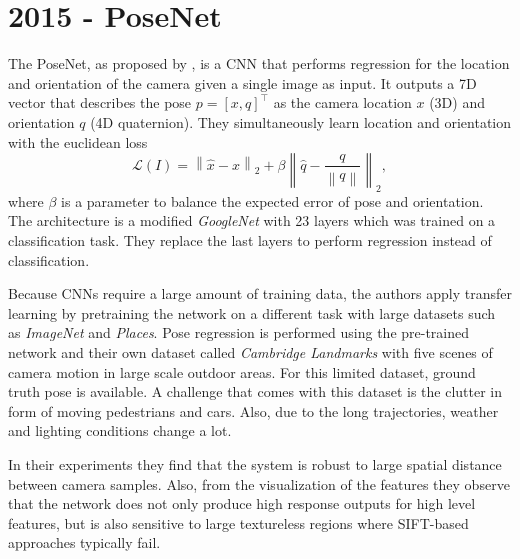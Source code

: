 %		
%		
	
	\section{2015 - PoseNet}
		The PoseNet, as proposed by \cite{kendall2015posenet}, is a CNN that performs regression for the location and orientation of the camera given a single image as input.
		It outputs a 7D vector that describes the pose $p = [x, q]^\top$ as the camera location $x$ (3D) and orientation $q$ (4D quaternion).
		They simultaneously learn location and orientation with the euclidean loss
		\begin{equation}
			\mathcal{L}(I) = 
			\left\|
				\hat{x} - x 
			\right\|_2 
			+ \beta 
			\left\| 
				\hat{q} - \frac{q}{\left\| q \right\|} 
			\right\|_2,
		\end{equation}
		where $\beta$ is a parameter to balance the expected error of pose and orientation.
		The architecture is a modified \emph{GoogleNet} with 23 layers which was trained on a classification task.
		They replace the last layers to perform regression instead of classification.
		
		Because CNNs require a large amount of training data, the authors apply transfer learning by pretraining the network on a different task with large datasets such as \emph{ImageNet} and \emph{Places}.
		Pose regression is performed using the pre-trained network and their own dataset called \emph{Cambridge Landmarks} with five scenes of camera motion in large scale outdoor areas.
		For this limited dataset, ground truth pose is available.
		A challenge that comes with this dataset is the clutter in form of moving pedestrians and cars.
		Also, due to the long trajectories, weather and lighting conditions change a lot.
		
		In their experiments they find that the system is robust to large spatial distance between camera samples.
		Also, from the visualization of the features they observe that the network does not only produce high response outputs for high level features, but is also sensitive to large textureless regions where {SIFT}-based approaches typically fail.
		
